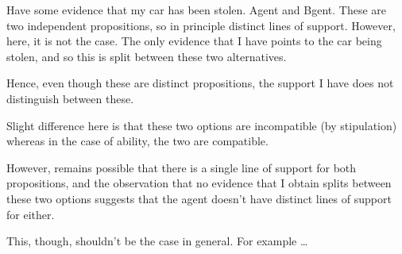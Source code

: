 \documentclass[10pt]{article}
\newcommand{\hozlinedash}[0]{%
  \noindent\hdashrule[0.5ex][c]{\textwidth}{.1pt}{2.5pt}
}
\begin{document}
\hozlinedash

\begin{note}
  Have some evidence that my car has been stolen.
  Agent and Bgent.
  These are two independent propositions, so in principle distinct lines of support.
  However, here, it is not the case.
  The only evidence that I have points to the car being stolen, and so this is split between these two alternatives.

  Hence, even though these are distinct propositions, the support I have does not distinguish between these.

  Slight difference here is that these two options are incompatible (by stipulation) whereas in the case of ability, the two are compatible.

  However, remains possible that there is a single line of support for both propositions, and the observation that no evidence that I obtain splits between these two options suggests that the agent doesn't have distinct lines of support for either.

  This, though, shouldn't be the case in general.
  For example \dots
\end{note}
\end{document}
